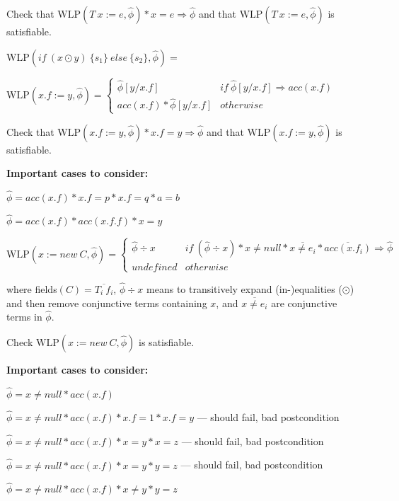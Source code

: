 \documentclass {article}
\newcommand{\eif}[3]{if \ ( #1 ) \ \{ #2 \} \ else \ \{#3\}}
\newcommand{\fphi}{\widehat{\phi}}
\newcommand{\imp}{\Rightarrow}
\newcommand{\wlp}[2]{\text{WLP}(#1,#2)}
\begin{document}
Check that $\wlp{T \ x := e}{\fphi} \ast x = e \imp \fphi$ and that $\wlp{T \ x := e}{\fphi}$ is satisfiable.

\vspace{0.5cm}

$\wlp{\eif{x \odot y}{s_1}{s_2}}{\fphi} = $

\vspace{0.5cm}

$\wlp{x.f := y}{\fphi} =  
	\begin{cases}
	 \fphi[y/x.f] & if \ \fphi[y/x.f] \imp acc(x.f) \\
	 acc(x.f) \ast \fphi[y/x.f] & otherwise
	\end{cases}$

Check that $\wlp{x.f := y}{\fphi} \ast x.f = y \imp \fphi$ and that $\wlp{x.f := y}{\fphi}$ is satisfiable.

\textbf{Important cases to consider:}

$\fphi = acc(x.f) \ast x.f = p \ast x.f = q \ast a = b $

$\fphi = acc(x.f) \ast acc(x.f.f) \ast x = y $

\vspace{0.5cm}

$\wlp{x := new\ C}{\fphi} = 
	\begin{cases}
	 \fphi \div x & if \ (\fphi \div x) \ast x \neq null \ast \overline{x \neq e_i} \ast \overline{acc(x.f_i)} \imp \fphi \\
	 undefined & otherwise
	\end{cases}$ 

where fields$(C) = \overline{T_i \ f_i}$, $\fphi \div x$ means to transitively expand (in-)equalities ($\odot$) and then remove conjunctive terms containing $x$, and $\overline{x \neq e_i}$ are conjunctive terms in $\fphi$. 

Check $\wlp{x := new\ C}{\fphi}$ is satisfiable.

\textbf{Important cases to consider:}

$\fphi = x \neq null \ast acc(x.f)$

$\fphi = x \neq null \ast acc(x.f) \ast x.f = 1 \ast x.f = y$ --- should fail, bad postcondition

$\fphi = x \neq null \ast acc(x.f) \ast x = y \ast x = z$ --- should fail, bad postcondition

$\fphi = x \neq null \ast acc(x.f) \ast x = y \ast y = z$ --- should fail, bad postcondition

$\fphi = x \neq null \ast acc(x.f) \ast x \neq y \ast y = z$
\end{document}
